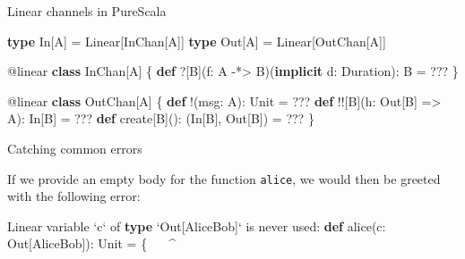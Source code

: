 \documentclass[ignorenonframetext,]{beamer}
\newenvironment{Shaded}{}{}
\newcommand{\FunctionTok}[1]{\textcolor[rgb]{0.02,0.16,0.49}{#1}}
\newcommand{\KeywordTok}[1]{\textcolor[rgb]{0.00,0.44,0.13}{\textbf{#1}}}
\newcommand{\NormalTok}[1]{#1}
\begin{document}
\begin{frame}[fragile]{%
\protect\hypertarget{linear-channels-in-purescala}{%
Linear channels in PureScala}}

\begin{Shaded}
\begin{Highlighting}[]
\KeywordTok{type}\NormalTok{ In[A]  = Linear[InChan[A]]}
\KeywordTok{type}\NormalTok{ Out[A] = Linear[OutChan[A]]}

\NormalTok{@linear }\KeywordTok{class}\NormalTok{ InChan[A] \{}
  \KeywordTok{def}\NormalTok{ ?[B](f: A -*> B)(}\KeywordTok{implicit}\NormalTok{ d: Duration): B = ???}
\NormalTok{\}}

\NormalTok{@linear }\KeywordTok{class}\NormalTok{ OutChan[A] \{}
  \KeywordTok{def}\NormalTok{ !(msg: A): Unit = ???}
  \KeywordTok{def}\NormalTok{ !![B](h: Out[B] => A): In[B] = ???}
  \KeywordTok{def}\NormalTok{ create[B](): (In[B], Out[B]) = ???}
\NormalTok{\}}
\end{Highlighting}
\end{Shaded}

\end{frame}

\begin{frame}[fragile]{%
\protect\hypertarget{catching-common-errors}{%
Catching common errors}}

If we provide an empty body for the function \texttt{alice}, we would
then be greeted with the following error:

\begin{Shaded}
\begin{Highlighting}[]
\NormalTok{Linear variable `c` of }\KeywordTok{type}\NormalTok{ `Out[AliceBob]` is never used:}
      \KeywordTok{def} \FunctionTok{alice}\NormalTok{(c: Out[AliceBob]): Unit = \{}
\NormalTok{                    ^^^^^^^^^^^^^^^^}
\end{Highlighting}
\end{Shaded}

\end{frame}
\end{document}
